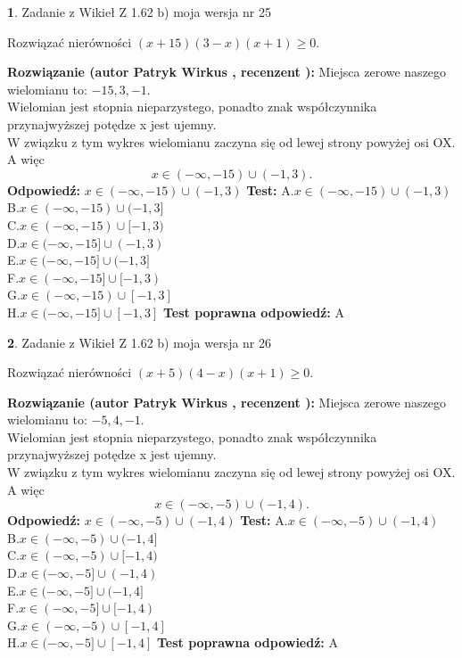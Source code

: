 \documentclass[12pt, a4paper]{article}
\theoremstyle{definition} %
\newtheorem{zad}{}
\newcommand{\zadStart}[1]{\begin{zad}#1\newline}
\newcommand{\zadStop}{\end{zad}}
\newcommand{\rozwStart}[2]{\noindent \textbf{Rozwiązanie (autor #1 , recenzent #2): }\newline}
\newcommand{\rozwStop}{\newline}
\newcommand{\odpStart}{\noindent \textbf{Odpowiedź:}\newline}
\newcommand{\odpStop}{\newline}
\newcommand{\testStart}{\noindent \textbf{Test:}\newline}
\newcommand{\testStop}{\newline}
\newcommand{\kluczStart}{\noindent \textbf{Test poprawna odpowiedź:}\newline}
\newcommand{\kluczStop}{\newline}
\begin{document}
\zadStart{Zadanie z Wikieł Z 1.62 b) moja wersja nr 25}

Rozwiązać nierówności $(x+15)(3-x)(x+1)\ge0$.
\zadStop
\rozwStart{Patryk Wirkus}{}
Miejsca zerowe naszego wielomianu to: $-15, 3, -1$.\\
Wielomian jest stopnia nieparzystego, ponadto znak współczynnika przy\linebreak najwyższej potędze x jest ujemny.\\ W związku z tym wykres wielomianu zaczyna się od lewej strony powyżej osi OX. A więc $$x \in (-\infty,-15) \cup (-1,3).$$
\rozwStop
\odpStart
$x \in (-\infty,-15) \cup (-1,3)$
\odpStop
\testStart
A.$x \in (-\infty,-15) \cup (-1,3)$\\
B.$x \in (-\infty,-15) \cup (-1,3]$\\
C.$x \in (-\infty,-15) \cup [-1,3)$\\
D.$x \in (-\infty,-15] \cup (-1,3)$\\
E.$x \in (-\infty,-15] \cup (-1,3]$\\
F.$x \in (-\infty,-15] \cup [-1,3)$\\
G.$x \in (-\infty,-15) \cup [-1,3]$\\
H.$x \in (-\infty,-15] \cup [-1,3]$
\testStop
\kluczStart
A
\kluczStop



\zadStart{Zadanie z Wikieł Z 1.62 b) moja wersja nr 26}

Rozwiązać nierówności $(x+5)(4-x)(x+1)\ge0$.
\zadStop
\rozwStart{Patryk Wirkus}{}
Miejsca zerowe naszego wielomianu to: $-5, 4, -1$.\\
Wielomian jest stopnia nieparzystego, ponadto znak współczynnika przy\linebreak najwyższej potędze x jest ujemny.\\ W związku z tym wykres wielomianu zaczyna się od lewej strony powyżej osi OX. A więc $$x \in (-\infty,-5) \cup (-1,4).$$
\rozwStop
\odpStart
$x \in (-\infty,-5) \cup (-1,4)$
\odpStop
\testStart
A.$x \in (-\infty,-5) \cup (-1,4)$\\
B.$x \in (-\infty,-5) \cup (-1,4]$\\
C.$x \in (-\infty,-5) \cup [-1,4)$\\
D.$x \in (-\infty,-5] \cup (-1,4)$\\
E.$x \in (-\infty,-5] \cup (-1,4]$\\
F.$x \in (-\infty,-5] \cup [-1,4)$\\
G.$x \in (-\infty,-5) \cup [-1,4]$\\
H.$x \in (-\infty,-5] \cup [-1,4]$
\testStop
\kluczStart
A
\kluczStop
\end{document}
